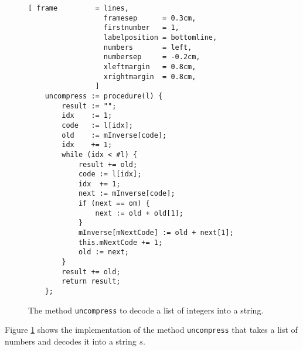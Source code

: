 \begin{figure}[!ht]
\centering
\begin{Verbatim}[ frame         = lines, 
                  framesep      = 0.3cm, 
                  firstnumber   = 1,
                  labelposition = bottomline,
                  numbers       = left,
                  numbersep     = -0.2cm,
                  xleftmargin   = 0.8cm,
                  xrightmargin  = 0.8cm,
                ]
    uncompress := procedure(l) {
        result := "";
        idx    := 1;
        code   := l[idx]; 
        old    := mInverse[code];
        idx    += 1;
        while (idx < #l) {
            result += old;
            code := l[idx];
            idx  += 1;
            next := mInverse[code];
            if (next == om) {
                next := old + old[1];
            }
            mInverse[mNextCode] := old + next[1];
            this.mNextCode += 1;
            old := next;
        }
        result += old;
        return result;
    };
\end{Verbatim}
\vspace*{-0.3cm}
\caption{The method \texttt{uncompress} to decode a list of integers into a string.}
\label{fig:lzw.stlx-uncompress}
\end{figure}
Figure \ref{fig:lzw.stlx-uncompress} shows the implementation of the method \texttt{uncompress} that
takes a list of numbers and decodes it into a string $s$.
